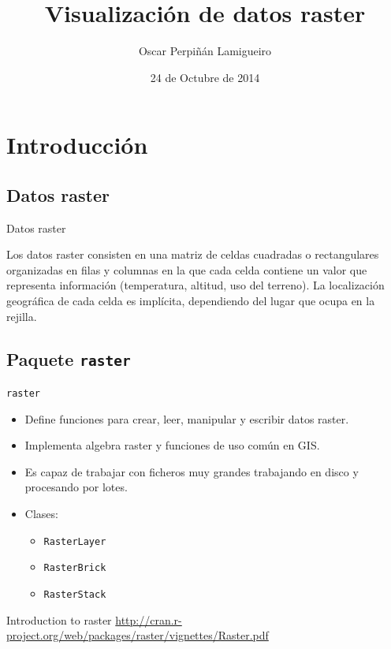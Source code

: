 \documentclass[xcolor={usenames,svgnames,dvipsnames}]{beamer}
\author{Oscar Perpiñán Lamigueiro}
\date{24 de Octubre de 2014}
\title{Visualización de datos raster}
\begin{document}
\maketitle

\section{Introducción}
\label{sec-1}

\subsection{Datos raster}
\label{sec-1-1}
\begin{frame}[label=sec-1-1-1]{Datos raster}
\begin{block}{}
Los datos raster consisten en una matriz de celdas cuadradas o
rectangulares organizadas en filas y columnas en la que cada celda
contiene un valor que representa información (temperatura, altitud,
uso del terreno). La localización geográfica de cada celda es
implícita, dependiendo del lugar que ocupa en la rejilla.
\end{block}
\end{frame}

\subsection{Paquete \texttt{raster}}
\label{sec-1-2}
\begin{frame}[fragile,label=sec-1-2-1]{\texttt{raster}}
 \begin{itemize}
\item Define funciones para crear, leer, manipular y escribir datos raster.
\item Implementa algebra raster y funciones de uso común en GIS.
\item Es capaz de trabajar con ficheros muy grandes trabajando en disco y procesando por lotes.
\item Clases:
\begin{itemize}
\item \texttt{RasterLayer}
\item \texttt{RasterBrick}
\item \texttt{RasterStack}
\end{itemize}
\end{itemize}

\begin{block}{Introduction to raster}
\url{http://cran.r-project.org/web/packages/raster/vignettes/Raster.pdf}
\end{block}
\end{frame}
\end{document}
